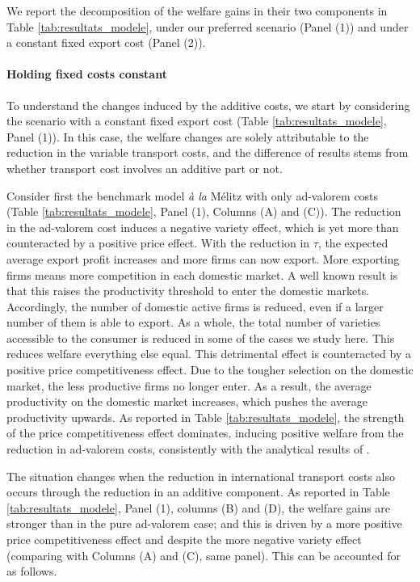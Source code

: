 \documentclass[a4paper,11pt]{article}
\begin{document}
We report the decomposition of the welfare gains in their two components in Table \ref{tab:resultats_modele}, under our preferred scenario (Panel (1)) and under a constant fixed export cost (Panel (2)).

\paragraph{Holding fixed costs constant} To understand the changes induced by the additive costs, we start by considering the scenario with a constant fixed export cost (Table  \ref{tab:resultats_modele}, Panel (1)). In this case, the welfare changes are solely attributable to the reduction in the variable transport costs, and the difference of results stems from whether transport cost involves an additive part or not.

Consider first the benchmark model \textit{\`{a} la} M\'{e}litz with only ad-valorem costs (Table \ref{tab:resultats_modele}, Panel (1), Columns (A) and (C)).
The reduction in the ad-valorem cost induces a negative variety effect, which is yet more than counteracted by a positive price effect.
With the reduction in $\tau$, the expected average export profit increases and more firms can now export.
More exporting firms means more competition in each domestic market.
A well known result is that this raises the productivity threshold to enter the domestic markets.
Accordingly, the number of domestic active firms is reduced, even if a larger number of them is able to export.
As a whole, the total number of varieties accessible to the consumer is reduced in some of the cases we study here.
This reduces welfare everything else equal.
This detrimental effect is counteracted by a positive price competitiveness effect.
Due to the tougher selection on the domestic market, the less productive firms no longer enter.
As a result, the average productivity on the domestic market increases, which pushes the average productivity upwards.
As reported in Table \ref{tab:resultats_modele}, the strength of the price competitiveness effect dominates, inducing positive welfare from the reduction in ad-valorem costs, consistently with the analytical results of \cite{melitz}.

The situation changes when the reduction in international transport costs also occurs through the reduction in an additive component.
As reported in Table \ref{tab:resultats_modele}, Panel (1), columns (B) and (D), the welfare gains are stronger than in the pure ad-valorem case; and this is driven by a more positive price competitiveness effect and despite the more negative variety effect (comparing with Columns (A) and (C), same panel).
This can be accounted for as follows.
\end{document}

